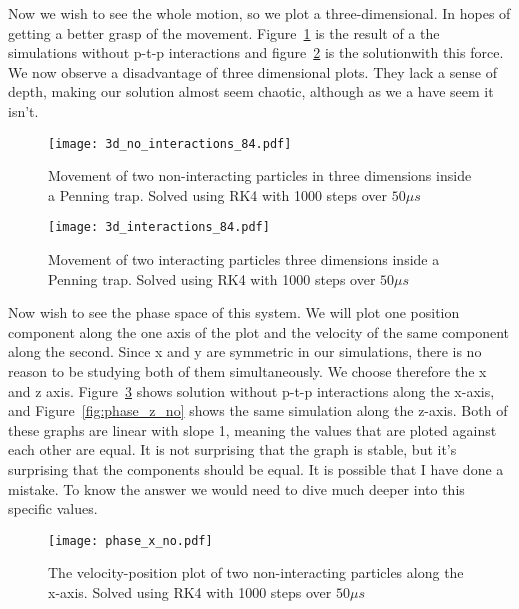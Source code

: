 \documentclass[english,notitlepage,reprint,nofootinbib]{revtex4-1}
\begin{document}
Now we wish to see the whole motion, so we plot a three-dimensional. In hopes of getting a better grasp of the movement. Figure~\ref{fig:3d_no} is the result of a the simulations without p-t-p interactions and figure~\ref{fig:3d_yes} is the solutionwith this force. We now observe a disadvantage of three dimensional plots. They lack a sense of depth, making our solution almost seem chaotic, although as we a have seem it isn't.


\FloatBarrier
\begin{figure}[ht]
    \centering %
    \texttt{[image: 3d\_no\_interactions\_84.pdf]} %
    \caption{Movement of two non-interacting particles in three dimensions inside a Penning trap. Solved using RK4 with 1000 steps over $50 \mu s$}
    \label{fig:3d_no}
\end{figure}
\FloatBarrier
\FloatBarrier
\begin{figure}[ht]
    \centering %
    \texttt{[image: 3d\_interactions\_84.pdf]} %
    \caption{Movement of two interacting particles three dimensions inside a Penning trap. Solved using RK4 with 1000 steps over $50 \mu s$}
    \label{fig:3d_yes}
\end{figure}
\FloatBarrier

Now wish to see the phase space of this system. We will plot one position component along the one axis of the plot and the velocity of the same component along the second. Since  x and y are symmetric in our simulations, there is no reason to be studying both of them simultaneously. We choose therefore the x and z axis. Figure~\ref{fig:phase_x_no} shows solution without p-t-p interactions along the x-axis, and Figure~\ref{fig:phase_z_no} shows the same simulation along the z-axis. Both of these graphs are linear with slope 1, meaning the values that are ploted against each other are equal. It is not surprising that the graph is stable, but it's surprising that the components should be equal. It is possible that I have done a mistake. To know the answer we would need to dive much deeper into this specific values.


\FloatBarrier
\begin{figure}[htbp]
   \centering %
    \texttt{[image: phase\_x\_no.pdf]} %
    \caption{The velocity-position plot of two non-interacting particles along the x-axis. Solved using RK4 with 1000 steps over $50 \mu s$}
    \label{fig:phase_x_no}
\end{figure}
\FloatBarrier
\end{document}
